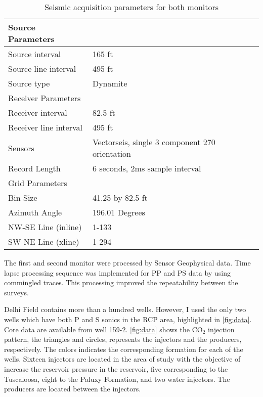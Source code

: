 


\begin{table}[h!]
\caption{ Seismic acquisition parameters for both monitors \label{tab:seispar}}
\begin{center}
\begin{tabular}{ | l | p{5cm} |}
\hline
Source Parameters             &   \\
\hline
Source interval            & 165 ft  \\
Source line interval           & 495 ft   \\
Source type     & Dynamite   \\
\hline
Receiver Parameters             &   \\
\hline
Receiver interval            & 82.5 ft  \\
Receiver line interval           & 495 ft   \\
Sensors &Vectorseis, single 3 component  270 orientation \\
Record Length & 6 seconds, 2ms sample interval\\
\hline
Grid Parameters             &   \\
\hline
Bin Size & 41.25 by 82.5 ft \\
Azimuth Angle & 196.01 Degrees \\
NW-SE Line (inline) & 1-133 \\
SW-NE Line (xline) & 1-294 \\
\hline
\end{tabular}
\end{center}
\end{table}

The first and second monitor were processed by Sensor Geophysical data. 
Time lapse processing sequence was implemented for PP and PS data by 
using commingled traces. This processing improved the repeatability 
between the surveys. 

Delhi Field contains more than a hundred wells. However, I used the only two wells 
which have  both P and S sonics in the RCP area, highlighted in \ref{fig:data}.
Core data are available from well 159-2. \ref{fig:data}
shows the CO$_2$ injection pattern, the triangles and circles, represents the 
injectors and the producers, respectively. The colors indicates the corresponding 
formation for each of the wells. Sixteen injectors are located in the area of study with
the objective of increase the reservoir pressure in the reservoir, 
five corresponding to the Tuscaloosa, eight to the Paluxy Formation, and two water
injectors. The producers are located between the injectors.


